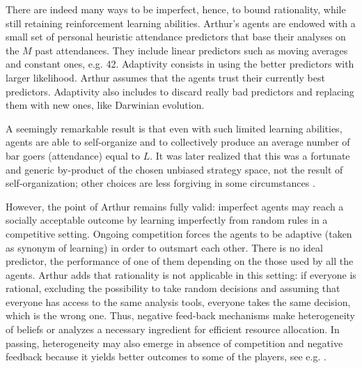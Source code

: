 \documentclass[aps,twocolumn,nofootinbib,sortedaddress,reprint]{revtex4-1}
\begin{document}
There are indeed many ways to be imperfect, hence, to bound rationality, while still retaining reinforcement learning abilities.   Arthur's agents are endowed with a small set of personal heuristic
attendance predictors that base their analyses on the $M$ past
attendances. They include linear predictors such as moving averages and constant ones, e.g. 42. Adaptivity consists in using the better predictors with larger likelihood. Arthur assumes that the agents trust their currently best predictors. Adaptivity also includes to discard really bad predictors and replacing them with new ones, like Darwinian evolution.

 A seemingly remarkable result is that even with such
limited learning abilities, agents are able to self-organize and to collectively produce an
average number of bar goers (attendance) equal to $L$. It was later
realized that this was a fortunate and generic by-product of the
chosen unbiased strategy space, not the result of self-organization; other
choices are less forgiving in some circumstances \cite{CMO03}.


However, the point of Arthur remains fully valid: imperfect agents may reach a socially acceptable outcome by learning
imperfectly from random rules in a competitive setting. Ongoing competition forces the agents
to be adaptive (taken as synonym of learning) in order to outsmart
each other. There is no ideal predictor, the performance of one of them depending on the those used by all the agents.
 Arthur adds that rationality is not applicable in this setting: if everyone is rational, excluding the possibility to take random decisions
and assuming that everyone has access to the same analysis tools,
everyone takes the same decision, which is the wrong one. Thus, negative feed-back mechanisms make
heterogeneity of beliefs or analyzes a necessary ingredient for
efficient resource allocation. In passing, heterogeneity may also emerge
  in absence of competition and negative feedback because it yields better outcomes to
  some of the players, see e.g. \textcite{matzke2011emergence}.
\end{document}
